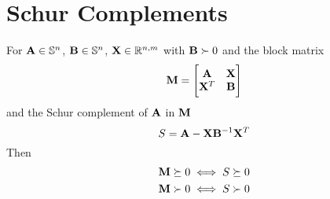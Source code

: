 \section{Schur Complements}

For $\mathbf{A}\in\mathbb{S}^{n}$, $\mathbf{B}\in\mathbb{S}^{n}$, $\mathbf{X}\in\mathbb{R}^{n,m}$ with $\mathbf{B}\succ0$ and the block matrix
\begin{equation}
\mathbf{M}=
\begin{bmatrix}
\mathbf{A} & \mathbf{X} \\
\mathbf{X}^T & \mathbf{B}
\end{bmatrix}
\end{equation}
and the Schur complement of $\mathbf{A}$ in $\mathbf{M}$
\begin{equation}
S=\mathbf{A}-\mathbf{X}\mathbf{B}^{-1}\mathbf{X}^T
\end{equation}
Then
\begin{align}
\mathbf{M}\succeq0&\iff S\succeq0 \\
\mathbf{M}\succ0 &\iff S\succ0
\end{align}
